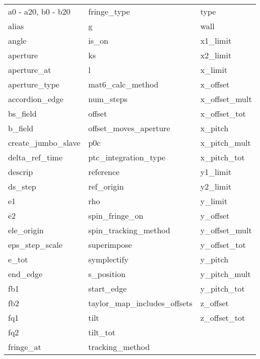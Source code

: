  \begin{tabular}{lll} \toprule
a0 - a20, b0 - b20          & fringe_type                 & type                        \\
alias                       & g                           & wall                        \\
angle                       & is_on                       & x1_limit                    \\
aperture                    & ks                          & x2_limit                    \\
aperture_at                 & l                           & x_limit                     \\
aperture_type               & mat6_calc_method            & x_offset                    \\
accordion_edge              & num_steps                   & x_offset_mult               \\
bs_field                    & offset                      & x_offset_tot                \\
b_field                     & offset_moves_aperture       & x_pitch                     \\
create_jumbo_slave          & p0c                         & x_pitch_mult                \\
delta_ref_time              & ptc_integration_type        & x_pitch_tot                 \\
descrip                     & reference                   & y1_limit                    \\
ds_step                     & ref_origin                  & y2_limit                    \\
e1                          & rho                         & y_limit                     \\
e2                          & spin_fringe_on              & y_offset                    \\
ele_origin                  & spin_tracking_method        & y_offset_mult               \\
eps_step_scale              & superimpose                 & y_offset_tot                \\
e_tot                       & symplectify                 & y_pitch                     \\
end_edge                    & s_position                  & y_pitch_mult                \\
fb1                         & start_edge                  & y_pitch_tot                 \\
fb2                         & taylor_map_includes_offsets & z_offset                    \\
fq1                         & tilt                        & z_offset_tot                \\
fq2                         & tilt_tot                    &                             \\
fringe_at                   & tracking_method             &                             \\
 \bottomrule
 \end{tabular}
 \vfill
 
